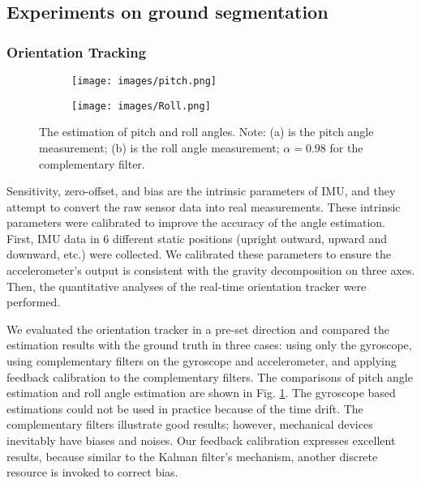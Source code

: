 \documentclass{ieeeaccess}
\begin{document}
\subsection{Experiments on ground segmentation}
\subsubsection{ Orientation Tracking}

\begin{figure}
    \centering
    \begin{subfigure}{1\linewidth}
      \centering
      \texttt{[image: images/pitch.png]}
      \caption{}
    
    \end{subfigure}
    \begin{subfigure}{1\linewidth}
      \centering
      \texttt{[image: images/Roll.png]}  
      \caption{}
     
    \end{subfigure}

    \caption{The estimation of pitch and roll angles. Note: (a) is the pitch angle measurement; (b) is the roll angle measurement; $\alpha = 0.98$ for the complementary filter.}%
    \label{fig:anglestimation}
\end{figure}
Sensitivity, zero-offset, and bias are the intrinsic parameters of IMU, and they attempt to convert the raw sensor data into real measurements. These intrinsic parameters were calibrated to improve the accuracy of the angle estimation. First, IMU data in 6 different static positions (upright outward, upward and downward, etc.) were collected. We calibrated these parameters to ensure the accelerometer's output is consistent with the gravity decomposition on three axes. Then, the quantitative analyses of the real-time orientation tracker were performed. 

We evaluated the orientation tracker in a pre-set direction and compared the estimation results with the ground truth in three cases: using only the gyroscope, using complementary filters on the gyroscope and accelerometer, and applying feedback calibration to the complementary filters. The comparisons of pitch angle estimation and roll angle estimation are shown in Fig. \ref{fig:anglestimation}. The gyroscope based estimations could not be used in practice because of the time drift. The complementary filters illustrate good results; however, mechanical devices inevitably have biases and noises. Our feedback calibration expresses excellent results, because similar to the Kalman filter's mechanism, another discrete resource is invoked to correct bias. 
\end{document}
